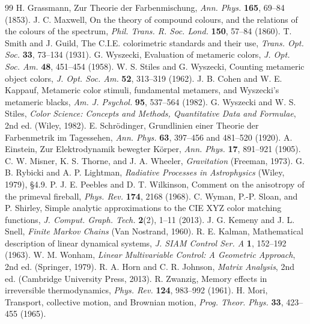 \documentclass[11pt]{article}
\theoremstyle{boldplain}
\theoremstyle{boldupright}
\begin{document}
\begin{thebibliography}{99}
 H. Grassmann, Zur Theorie der Farbenmischung, \emph{Ann. Phys.} \textbf{165}, 69--84 (1853).
 J. C. Maxwell, On the theory of compound colours, and the relations of the colours of the spectrum, \emph{Phil. Trans. R. Soc. Lond.} \textbf{150}, 57--84 (1860).
 T. Smith and J. Guild, The C.I.E. colorimetric standards and their use, \emph{Trans. Opt. Soc.} \textbf{33}, 73--134 (1931).
 G. Wyszecki, Evaluation of metameric colors, \emph{J. Opt. Soc. Am.} \textbf{48}, 451--454 (1958).
 W. S. Stiles and G. Wyszecki, Counting metameric object colors, \emph{J. Opt. Soc. Am.} \textbf{52}, 313--319 (1962).
 J. B. Cohen and W. E. Kappauf, Metameric color stimuli, fundamental metamers, and Wyszecki's metameric blacks, \emph{Am. J. Psychol.} \textbf{95}, 537--564 (1982).
 G. Wyszecki and W. S. Stiles, \emph{Color Science: Concepts and Methods, Quantitative Data and Formulae}, 2nd ed. (Wiley, 1982).
 E. Schr\"odinger, Grundlinien einer Theorie der Farbenmetrik im Tagessehen, \emph{Ann. Phys.} \textbf{63}, 397--456 and 481--520 (1920).
 A. Einstein, Zur Elektrodynamik bewegter K\"orper, \emph{Ann. Phys.} \textbf{17}, 891--921 (1905).
 C. W. Misner, K. S. Thorne, and J. A. Wheeler, \emph{Gravitation} (Freeman, 1973).
 G. B. Rybicki and A. P. Lightman, \emph{Radiative Processes in Astrophysics} (Wiley, 1979), \S4.9.
 P. J. E. Peebles and D. T. Wilkinson, Comment on the anisotropy of the primeval fireball, \emph{Phys. Rev.} \textbf{174}, 2168 (1968).
 C. Wyman, P.-P. Sloan, and P. Shirley, Simple analytic approximations to the CIE XYZ color matching functions, \emph{J. Comput. Graph. Tech.} \textbf{2}(2), 1--11 (2013).
 J. G. Kemeny and J. L. Snell, \emph{Finite Markov Chains} (Van Nostrand, 1960).
 R. E. Kalman, Mathematical description of linear dynamical systems, \emph{J. SIAM Control Ser. A} \textbf{1}, 152--192 (1963).
 W. M. Wonham, \emph{Linear Multivariable Control: A Geometric Approach}, 2nd ed. (Springer, 1979).
 R. A. Horn and C. R. Johnson, \emph{Matrix Analysis}, 2nd ed. (Cambridge University Press, 2013).
 R. Zwanzig, Memory effects in irreversible thermodynamics, \emph{Phys. Rev.} \textbf{124}, 983--992 (1961).
 H. Mori, Transport, collective motion, and Brownian motion, \emph{Prog. Theor. Phys.} \textbf{33}, 423--455 (1965).

\end{thebibliography}
\end{document}
